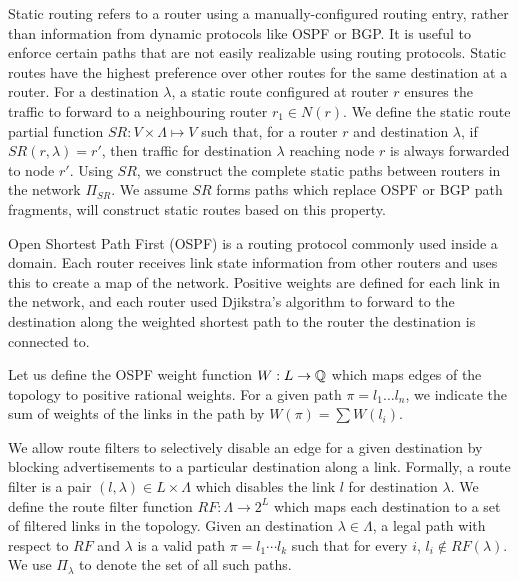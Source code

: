  Static routing refers to a router using a
manually-configured routing entry, rather than information from
dynamic protocols like OSPF or BGP.  It is useful to enforce certain
paths that are not easily realizable using routing protocols.  Static
routes have the highest preference over other routes for the same
destination at a router.  For a destination $\lambda$, a static route
configured at router $r$ ensures the traffic to forward to a
neighbouring router $r_1 \in N(r)$. We define the static route partial
function $SR: V \times \Lambda \mapsto V$ such that, for a router $r$
and destination $\lambda$, if $SR(r,\lambda)=r'$, then traffic for
destination $\lambda$ reaching node $r$ is always forwarded to node
$r'$. Using $SR$, we
construct the complete static paths between routers in the network
$\Pi_{SR}$. We assume $SR$ forms paths which replace OSPF or
BGP path fragments, \name will construct static routes based on this
property.


 Open Shortest Path First (OSPF) is a routing
protocol commonly used inside a domain. Each router receives link
state information from other routers and uses this to create a map of
the network. Positive weights are defined for each link in the
network, and each router used Djikstra's algorithm to forward to the
destination along the weighted shortest path to the router the
destination   is connected to.

Let us
define the OSPF weight function $W: L \rightarrow \mathbb{Q}$ which 
maps edges of the topology to positive rational weights. 
For a given
path $\pi=l_1\ldots l_n$, we indicate the sum of weights of the
links in the path by $W(\pi)=\sum W(l_i)$. 


We allow  route filters
to selectively disable an
edge for a given destination by  
blocking advertisements to a
particular destination along a link. 
Formally, a  route filter is a pair $(l,\lambda)\in L\times \Lambda$
which disables the link $l$ for destination $\lambda$. 
We define the  route filter function 
$RF: \Lambda \rightarrow 2^L$ which maps each destination  
to a set of filtered links in the topology. 
Given an   destination $\lambda\in \Lambda$, 
a legal path with respect to $RF$ and $\lambda$
is a valid path $\pi=l_1\cdots l_k$ such that for every $i$,
$l_i\not\in RF(\lambda)$.
We use $\Pi_\lambda$ to denote the set of all such paths.

